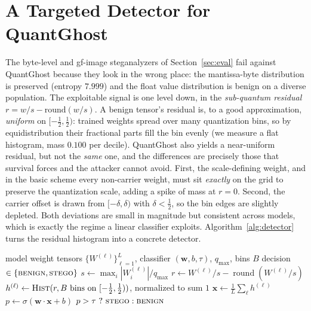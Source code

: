 \documentclass[10pt,journal]{IEEEtran}
\theoremstyle{remark}
\newcommand{\sys}{\mbox{QuantGhost}}
\begin{document}
\section{A Targeted Detector for \sys}\label{sec:detector}
The byte-level and gf-image steganalyzers of Section~\ref{sec:eval} fail against \sys{}
because they look in the wrong place: the mantissa-byte distribution is preserved
(entropy $7.999$) and the float value distribution is benign on a diverse population.
The exploitable signal is one level down, in the \emph{sub-quantum residual}
$r=w/s-\mathrm{round}(w/s)$. A benign tensor's residual is, to a good approximation,
\emph{uniform} on $[-\tfrac12,\tfrac12)$: trained weights spread over many quantization
bins, so by equidistribution their fractional parts fill the bin evenly (we measure a flat
histogram, mass $0.100$ per decile). \sys{} also yields a near-uniform residual, but not the
\emph{same} one, and the differences are precisely those that survival forces and the
attacker cannot avoid. First, the scale-defining weight, and in the basic scheme every
non-carrier weight, must sit \emph{exactly} on the grid to preserve the quantization scale,
adding a spike of mass at $r=0$. Second, the carrier offset is drawn from $[-\delta,\delta)$
with $\delta<\tfrac12$, so the bin edges are slightly depleted. Both deviations are small in
magnitude but consistent across models, which is exactly the regime a linear classifier
exploits. Algorithm~\ref{alg:detector} turns the residual histogram into a concrete detector.

\begin{algorithm}[t]
\caption{Sub-quantum residual steganalyzer}
\label{alg:detector}
\begin{algorithmic}[1]
\Require model weight tensors $\{W^{(\ell)}\}_{\ell=1}^{L}$, classifier $(\mathbf{w},b,\tau)$, $q_{\max}$, bins $B$
\Ensure decision $\in\{\textsc{benign},\textsc{stego}\}$
  \State $s \gets \max_i|W^{(\ell)}_i| / q_{\max}$
  \State $r \gets W^{(\ell)}/s - \operatorname{round}(W^{(\ell)}/s)$ \Comment{residual in $[-\tfrac12,\tfrac12)$}
  \State $h^{(\ell)} \gets \textsc{Hist}(r, B \text{ bins on } [-\tfrac12,\tfrac12))$, normalized to sum $1$
\EndFor
\State $\mathbf{x} \gets \tfrac{1}{L}\sum_{\ell} h^{(\ell)}$ 
\State $p \gets \sigma(\mathbf{w}\!\cdot\!\mathbf{x}+b)$ 
\State \Return $p>\tau\ ?\ \textsc{stego} : \textsc{benign}$
\end{algorithmic}
\end{algorithm}
\end{document}
